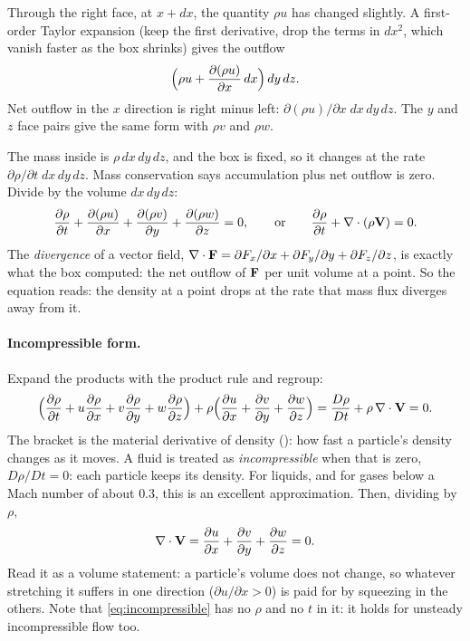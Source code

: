 Through the right face, at $x + dx$, the quantity $\rho u$ has changed slightly. A first-order Taylor expansion (keep the first derivative, drop the terms in $dx^2$, which vanish faster as the box shrinks) gives the outflow
\[
\Big(\rho u + \frac{\partial (\rho u)}{\partial x}\,dx\Big)\,dy\,dz .
\]
Net outflow in the $x$ direction is right minus left: $\partial(\rho u)/\partial x\;dx\,dy\,dz$. The $y$ and $z$ face pairs give the same form with $\rho v$ and $\rho w$.

The mass inside is $\rho\,dx\,dy\,dz$, and the box is fixed, so it changes at the rate $\partial\rho/\partial t\;dx\,dy\,dz$. Mass conservation says accumulation plus net outflow is zero. Divide by the volume $dx\,dy\,dz$:
\begin{equation}
\frac{\partial \rho}{\partial t} + \frac{\partial (\rho u)}{\partial x} + \frac{\partial (\rho v)}{\partial y} + \frac{\partial (\rho w)}{\partial z} = 0,
\qquad\text{or}\qquad
\frac{\partial \rho}{\partial t} + \nabla\cdot(\rho\mathbf{V}) = 0 .
\label{eq:continuity}
\end{equation}
The \emph{divergence} of a vector field, $\nabla\cdot\mathbf{F} = \partial F_x/\partial x + \partial F_y/\partial y + \partial F_z/\partial z$, is exactly what the box computed: the net outflow of $\mathbf{F}$ per unit volume at a point. So the equation reads: the density at a point drops at the rate that mass flux diverges away from it.

\paragraph{Incompressible form.} Expand the products with the product rule and regroup:
\[
\Big(\frac{\partial \rho}{\partial t} + u\frac{\partial \rho}{\partial x} + v\frac{\partial \rho}{\partial y} + w\frac{\partial \rho}{\partial z}\Big) + \rho\Big(\frac{\partial u}{\partial x} + \frac{\partial v}{\partial y} + \frac{\partial w}{\partial z}\Big)
= \frac{D\rho}{Dt} + \rho\,\nabla\cdot\mathbf{V} = 0 .
\]
The bracket is the material derivative of density (): how fast a particle's density changes as it moves. A fluid is treated as \emph{incompressible} when that is zero, $D\rho/Dt = 0$: each particle keeps its density. For liquids, and for gases below a Mach number of about $0.3$, this is an excellent approximation. Then, dividing by $\rho$,
\begin{equation}
\nabla\cdot\mathbf{V} = \frac{\partial u}{\partial x} + \frac{\partial v}{\partial y} + \frac{\partial w}{\partial z} = 0 .
\label{eq:incompressible}
\end{equation}
Read it as a volume statement: a particle's volume does not change, so whatever stretching it suffers in one direction ($\partial u/\partial x > 0$) is paid for by squeezing in the others. Note that \eqref{eq:incompressible} has no $\rho$ and no $t$ in it: it holds for unsteady incompressible flow too.


